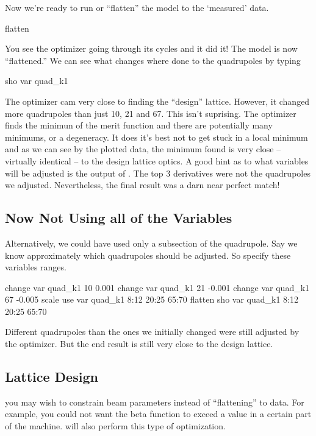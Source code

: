Now we're ready to run or ``flatten'' the model to the `measured' data.
\begin{example}
  flatten
\end{example}
You see the optimizer going through its cycles and it did it! The model is now
``flattened.'' We can see what changes where done to the quadrupoles by typing
\begin{example}
  sho var quad\_k1
\end{example}
The optimizer cam very close to finding the ``design'' lattice. However, it changed 
more quadrupoles
than just 10, 21 and 67. This isn't suprising. The optimizer finds the minimun
of the merit function and there are potentially many minimums, or a degeneracy.
 It does it's best
not to get stuck in a local minimum and as we can see by the plotted data, the
minimum found is very close -- virtually identical -- to the design lattice optics. 
A good hint as to what variables will be adjusted is the output of . 
The top 3
derivatives were not the quadrupoles we adjusted. Nevertheless, the final result
was a darn near perfect match!

\subsection{Now Not Using all of the Variables}
\label{ss:fix_it}

Alternatively, we could have used only a subsection of the quadrupole. Say we
know approximately which quadrupoles should be adjusted. So specify these
variables ranges.
\begin{example}
  change var quad\_k1 10 0.001
  change var quad\_k1 21 -0.001
  change var quad\_k1 67 -0.005
  scale
  use var quad\_k1 8:12 20:25 65:70
  flatten
  sho var quad\_k1 8:12 20:25 65:70
\end{example}
Different quadrupoles than the ones we initially changed were still adjusted
by the optimizer. But the end result is still very close to the design lattice.

\subsection{Lattice Design}
\label{ss:lattice_design}

you may wish to constrain beam
parameters instead of ``flattening'' to data. For example, you could not want
the beta function to exceed a value in a certain part of the machine. \tao will
also perform this type of optimization.

